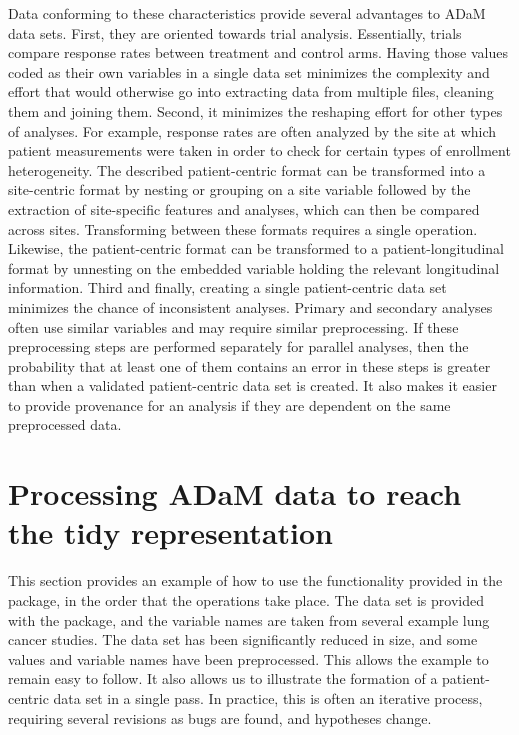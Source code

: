 \noindent Data conforming to these characteristics provide several
advantages to ADaM data sets. First, they are oriented towards trial
analysis. Essentially, trials compare response rates between treatment
and control arms. Having those values coded as their own variables in a
single data set minimizes the complexity and effort that would otherwise
go into extracting data from multiple files, cleaning them and joining
them. Second, it minimizes the reshaping effort for other types of
analyses. For example, response rates are often analyzed by the site at
which patient measurements were taken in order to check for certain
types of enrollment heterogeneity. The described patient-centric format
can be transformed into a site-centric format by nesting or grouping on
a site variable followed by the extraction of site-specific features and
analyses, which can then be compared across sites. Transforming between
these formats requires a single operation. Likewise, the patient-centric
format can be transformed to a patient-longitudinal format by unnesting
on the embedded variable holding the relevant longitudinal information.
Third and finally, creating a single patient-centric data set minimizes
the chance of inconsistent analyses. Primary and secondary analyses
often use similar variables and may require similar preprocessing. If
these preprocessing steps are performed separately for parallel
analyses, then the probability that at least one of them contains an
error in these steps is greater than when a validated patient-centric
data set is created. It also makes it easier to provide provenance for
an analysis if they are dependent on the same preprocessed data.

\hypertarget{processing-adam-data-to-reach-the-tidy-representation}{%
\section{Processing ADaM data to reach the tidy
representation}\label{processing-adam-data-to-reach-the-tidy-representation}}

This section provides an example of how to use the functionality
provided in the  package, in the order that the operations
take place. The data set is provided with the package, and the variable
names are taken from several example lung cancer studies. The data set
has been significantly reduced in size, and some values and variable
names have been preprocessed. This allows the example to remain easy to
follow. It also allows us to illustrate the formation of a
patient-centric data set in a single pass. In practice, this is often an
iterative process, requiring several revisions as bugs are found, and
hypotheses change.


